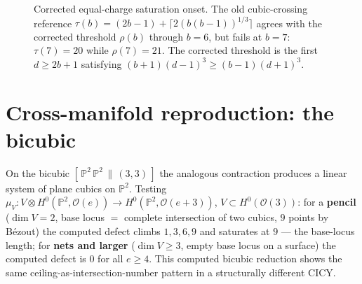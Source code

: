 \documentclass[11pt]{article}
\theoremstyle{plain}
\theoremstyle{definition}
\theoremstyle{remark}
\newcommand{\PP}{\mathbb{P}}
\newcommand{\cO}{\mathcal{O}}
\begin{document}
\begin{figure}[t]
\centering
{}
\caption{Corrected equal-charge saturation onset. The old cubic-crossing reference $\tau(b)=(2b-1)+\lceil2(b(b-1))^{1/3}\rceil$ agrees with the corrected threshold $\rho(b)$ through $b=6$, but fails at $b=7$: $\tau(7)=20$ while $\rho(7)=21$. The corrected threshold is the first $d\ge2b+1$ satisfying $(b+1)(d-1)^3\ge(b-1)(d+1)^3$.}
\label{fig:onset}
\end{figure}

\FloatBarrier
\section{Cross-manifold reproduction: the bicubic}\label{sec:bicubic}

On the bicubic $[\,\PP^2\,\PP^2\,\|\,(3,3)\,]$ the analogous contraction produces a linear system of plane cubics on $\PP^2$. Testing $\mu_V: V\otimes H^0(\PP^2,\cO(e))\to H^0(\PP^2,\cO(e+3))$, $V\subset H^0(\cO(3))$:
for a \textbf{pencil} ($\dim V=2$, base locus $=$ complete intersection of two cubics, $9$ points by B\'ezout) the computed defect climbs $1,3,6,9$ and saturates at $9$ --- the base-locus length; for \textbf{nets and larger} ($\dim V\ge 3$, empty base locus on a surface) the computed defect is $0$ for all $e\ge 4$. This computed bicubic reduction shows the same ceiling-as-intersection-number pattern in a structurally different CICY.
\end{document}
